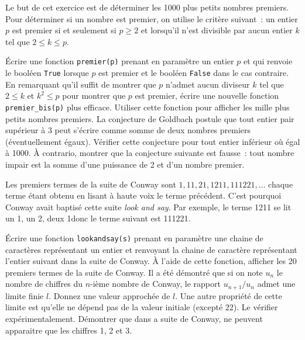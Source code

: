 \documentclass{magnoliaold}
\begin{document}
Le but de cet exercice est de déterminer les 1000 plus petits nombres premiers. Pour
déterminer si un nombre est premier, on utilise le critère suivant~: un entier $p$ est
premier si et seulement si $p\geq 2$ et lorsqu'il n'est divisible par aucun entier
$k$ tel que $2\leq k\leq p$.
\begin{questions}
\question Écrire une fonction \verb!premier(p)! prenant en paramètre un entier $p$ et qui
  renvoie le booléen \verb!True! lorsque $p$ est premier et le booléen \verb!False!
	dans le cas contraire.
\question En remarquant qu'il suffit de montrer que $p$ n'admet aucun diviseur $k$
  tel que $2\leq k$ et $k^2\leq p$ pour montrer que $p$ est premier, écrire une
  nouvelle fonction \verb!premier_bis(p)! plus efficace.
\question Utiliser cette fonction pour afficher les mille plus petits nombres premiers.
\question La conjecture de Goldbach postule que tout entier pair supérieur à 3
  peut s'écrire comme somme de deux nombres premiers (éventuellement égaux). Vérifier
	cette conjecture pour tout entier inférieur où égal à 1000.
\question À contrario, montrer que la conjecture suivante est fausse~: tout nombre impair
  est la somme d'une puissance de 2 et d'un nombre premier.
\end{questions}

Les premiers termes de la suite de Conway sont $1, 11, 21, 1211, 111221,\ldots$
chaque terme étant obtenu en lisant à haute voix le terme précédent. C'est pourquoi
Conway avait baptisé cette suite \emph{look and say}. Par exemple, le terme
1211 se lit \og un 1, un 2, deux 1\fg donc le terme suivant est 111221.
\begin{questions}
\question Écrire une fonction \verb!lookandsay(s)! prenant en paramètre une chaine de
  caractères représentant un entier et renvoyant la chaine de caractère représentant
	l'entier suivant dans la suite de Conway.
\question À l'aide de cette fonction, afficher les 20 premiers termes de la suite de
  Conway.
\question Il a été démontré que si on note $u_n$ le nombre de chiffres du $n$-ième
  nombre de Conway, le rapport $u_{n+1}/u_n$ admet une limite finie $l$.
	Donnez une valeur approchée de $l$.
\question Une autre propriété de cette limite est qu'elle ne dépend pas de la
  valeur initiale (excepté 22). Le vérifier expérimentalement.
\question Démontrer que dans a suite de Conway, ne peuvent apparaitre que les chiffres 1, 2 et 3.
\end{questions}

\end{document}
